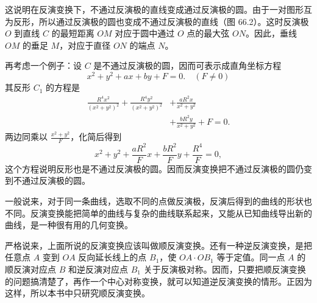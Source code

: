 \noindent
\begin{minipage}[t]{0.41\textwidth}
  \vspace{0pt}
  \centering
\end{minipage}
\hfill
\begin{minipage}[t]{0.56\textwidth}
  \vspace{0pt}
  \hspace{2em}这说明在反演变换下，不通过反演极的直线变成通过反演极的圆。由于一对图形互为反形，所以通过反演极的圆也变成不通过反演极的直线（图 66.2）。这时反演极 $O$ 到直线 $C$ 的最短距离 $OM$ 对应于圆中通过 $O$ 点的最大弦 $ON$。因此，垂线 $OM$ 的垂足 $M$，对应于直径 $ON$ 的端点 $N$。
\end{minipage}

\medskip
\noindent
再考虑一个例子：设 $C$ 是不通过反演极的圆，因而可表示成直角坐标方程
\[
  x^2+y^2+ax+by+F=0.\quad (F\neq 0)
\]
其反形 $C_1$ 的方程是
\begin{align*}
  \frac{R^4 x^2}{(x^2+y^2)^2} + \frac{R^4 y^2}{(x^2+y^2)^2}
  &+ \frac{aR^2 x}{x^2+y^2} \\
  &+ \frac{bR^2 y}{x^2+y^2} + F = 0.
\end{align*}
两边同乘以 $\frac{x^2+y^2}{F}$，化简后得到
\[
  x^2+y^2 + \frac{aR^2}{F}x + \frac{bR^2}{F}y + \frac{R^4}{F} = 0,
\]
这个方程说明反形也是不通过反演极的圆。因而反演变换把不通过反演极的圆仍变到不通过反演极的圆。

一般说来，对于同一条曲线，选取不同的点做反演极，反演后得到的曲线的形状也不同。反演变换能把简单的曲线与复杂的曲线联系起来，又能从已知曲线导出新的曲线，是一种很有用的几何变换。

严格说来，上面所说的反演变换应该叫做顺反演变换。还有一种逆反演变换，是把任意点 $A$ 变到 $OA$ 反向延长线上的点 $B_1$，使 $OA\cdot OB_1$ 等于定值。同一点 $A$ 的顺反演对应点 $B$ 和逆反演对应点 $B_1$ 关于反演极对称。因而，只要把顺反演变换的问题搞清楚了，再作一个中心对称变换，就可以知道逆反演变换的情形。正因为这样，所以本书中只研究顺反演变换。
